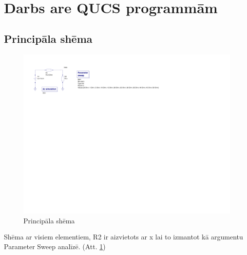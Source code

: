 \documentclass{report}
\begin{document}
\section{Darbs are QUCS programmām}
\subsection{Principāla shēma}
\begin{figure}[!tb]
\includegraphics[width=\textwidth,height=\textheight,keepaspectratio]{IMAGES/02.png}
\caption{Principāla shēma}
\label{Principala shema}
\end{figure}
Shēma ar visiem elementiem, R2 ir aizvietots ar x lai to izmantot kā argumentu Parameter Sweep analīzē. (Att. \ref{Principala shema})
\end{document}
